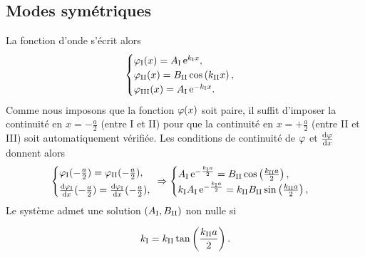 \documentclass[12pt,fancy]{cours}
\begin{document}

\subsection{Modes symétriques}
La fonction d'onde s'écrit alors
\begin{equation}
\begin{cases}
\varphi_{\rm{I}}(x)=A_\mathrm{I}\,\mathrm{e}^{k_\mathrm{I}x},\\
\varphi_{\rm{II}}(x)= B_\mathrm{II}\cos\left(k_\mathrm{II}x\right),\\
\varphi_{\rm{III}}(x)=A_\mathrm{I}\,\mathrm{e}^{-k_\mathrm{I}x}.
\end{cases}
\label{eq:def_k1_k2}
\end{equation}
Comme nous imposons que la fonction $\varphi(x)$ soit paire, il suffit d'imposer la continuité en $x=-\frac{a}{2}$ (entre I et II) pour que la continuité en $x=+\frac{a}{2}$ (entre II et III) soit automatiquement vérifiée. Les conditions de continuité de $\varphi$ et $\frac{\mathrm{d}{\varphi}}{\mathrm{d}{x}}$ donnent alors
\begin{equation}
\begin{cases}
\varphi_{\rm{I}}(-\frac{a}{2})=\varphi_{\rm{II}}(-\frac{a}{2}),\\[1mm]
\frac{\mathrm{d}{\varphi_{\rm{I}}}}{\mathrm{d}{x}}(-\frac{a}{2})=\frac{\mathrm{d}{\varphi_{\rm{I}}}}{\mathrm{d}{x}}(-\frac{a}{2}),
\end{cases}
\!\!\!\!\Rightarrow
\begin{cases}
A_\mathrm{I}\,\mathrm{e}^{-\frac{k_\mathrm{I}a}{2}}= B_\mathrm{II}\cos\left(\frac{k_\mathrm{II}a}{2}\right),\\
k_\mathrm{I}A_\mathrm{I}\,\mathrm{e}^{-\frac{k_\mathrm{I}a}{2}}=k_\mathrm{II}B_\mathrm{II}\sin\left(\frac{k_\mathrm{II}a}{2}\right),
\end{cases}
\label{eqn:cls_puits_fini}
\end{equation}
Le système admet une solution $(A_{\rm{I}},B_{\rm{II}})$ non nulle si
\begin{theorem}\label{form:k2}
  \begin{equation*}
    k_{\rm{I}}=k_{\rm{II}}\tan\left(\frac{k_{\rm{II}}a}{2}\right).
  \end{equation*}
\end{theorem}
\end{document}
